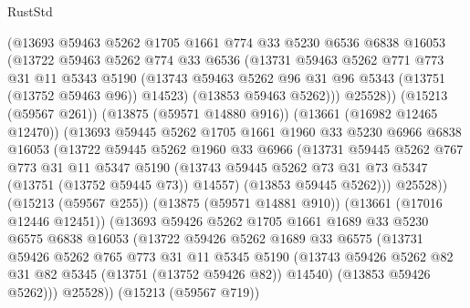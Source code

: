 \begin{lexlean}{RustStd}
\begin{coremodule}
                (@13693
                  @59463
                  @5262
                  @1705
                  @1661
                  @774
                  @33
                  @5230
                  @6536
                  @6838
                  @16053
                  (@13722
                    @59463
                    @5262
                    @774
                    @33
                    @6536
                    (@13731
                      @59463
                      @5262
                      @771
                      @773
                      @31
                      @11
                      @5343
                      @5190
                      (@13743 @59463 @5262 @96 @31 @96 @5343 (@13751 (@13752 @59463 @96)) @14523)
                      (@13853 @59463 @5262)))
                  @25528))
              (@15213 (@59567 @261))
              (@13875 (@59571 @14880 @916))
              (@13661 (@16982 @12465 @12470))
              (@13693
                @59445
                @5262
                @1705
                @1661
                @1960
                @33
                @5230
                @6966
                @6838
                @16053
                (@13722
                  @59445
                  @5262
                  @1960
                  @33
                  @6966
                  (@13731
                    @59445
                    @5262
                    @767
                    @773
                    @31
                    @11
                    @5347
                    @5190
                    (@13743 @59445 @5262 @73 @31 @73 @5347 (@13751 (@13752 @59445 @73)) @14557)
                    (@13853 @59445 @5262)))
                @25528))
            (@15213 (@59567 @255))
            (@13875 (@59571 @14881 @910))
            (@13661 (@17016 @12446 @12451))
            (@13693
              @59426
              @5262
              @1705
              @1661
              @1689
              @33
              @5230
              @6575
              @6838
              @16053
              (@13722
                @59426
                @5262
                @1689
                @33
                @6575
                (@13731
                  @59426
                  @5262
                  @765
                  @773
                  @31
                  @11
                  @5345
                  @5190
                  (@13743 @59426 @5262 @82 @31 @82 @5345 (@13751 (@13752 @59426 @82)) @14540)
                  (@13853 @59426 @5262)))
              @25528))
          (@15213 (@59567 @719))

\end{coremodule}
\end{lexlean}
